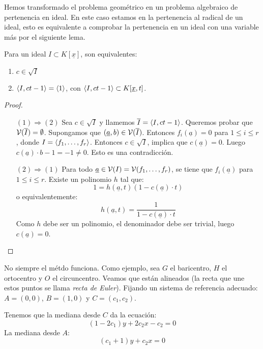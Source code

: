 \documentclass[twoside]{report}
\begin{document}
Hemos transformado el problema geométrico en un problema algebraico de pertenencia en ideal.
En este caso estamos en la pertenencia al radical de un ideal, esto es equivalente a comprobar la pertenencia en un ideal con una variable más por el siguiente lema.

\begin{lemma}
Para un ideal $I \subset K[\underline{x}]$, son equivalentes:
\begin{enumerate}
\item $c \in \sqrt{I}$
\item $\langle{I, ct-1}\rangle = \langle{1}\rangle$, con $\langle{I, ct-1}\rangle \subset K[\underline{x},t]$.
\end{enumerate}
\end{lemma}
\begin{proof}\mbox{}
\begin{itemize}
\item[$(1)\Rightarrow(2)$] Sea $c \in \sqrt{I}$ y llamemos $\overline{I} = \langle{I, ct-1}\rangle$.
Queremos probar que $\mathcal{V}(\overline{I})=\emptyset$.
Supongamos que $(\underline{a},b) \in \mathcal{V}(\overline{I})$.
Entonces $f_i(\underline{a}) = 0$ para $1\leq i \leq r$, donde $I = \langle{f_1,\dots,f_r}\rangle$.
Entonces $c \in \sqrt{I}$, implica que $c(\underline{a})=0$.
Luego $c(\underline{a})\cdot b - 1 = -1 \neq 0$.
Esto es una contradicción. 
\item[$(2)\Rightarrow(1)$] 
Para todo $\underline{a} \in \mathcal{V}(I) = \mathcal{V}(f_1,\dots,f_r)$, se tiene que $f_i(\underline{a})$ para $1\leq i \leq r$.
Existe un polinomio $h$ tal que:
\[ 1 = h(\underline{a},t)(1-c(\underline{a})\cdot t)\]
o equivalentemente:
\[ h(\underline{a},t) = \frac{1}{1-c(\underline{a})\cdot t} \]
Como $h$ debe ser un polinomio, el denominador debe ser trivial, luego $c(\underline{a}) = 0$.
\end{itemize}
\end{proof}

No siempre el métdo funciona.
Como ejemplo, sea $G$ el baricentro, $H$ el ortocentro y $O$ el circuncentro.
Veamos que están alineados (la recta que une estos puntos se llama \emph{recta de Euler}).
Fijando un sistema de referencia adecuado: $A=(0,0)$, $B=(1,0)$ y $C=(c_1,c_2)$.

Tenemos que la mediana desde $C$ da la ecuación:
\[ (1-2c_1)y+2c_2x-c_2 = 0 \]
La mediana desde $A$:
\[ (c_1+1)y+c_2x = 0 \]
\end{document}
